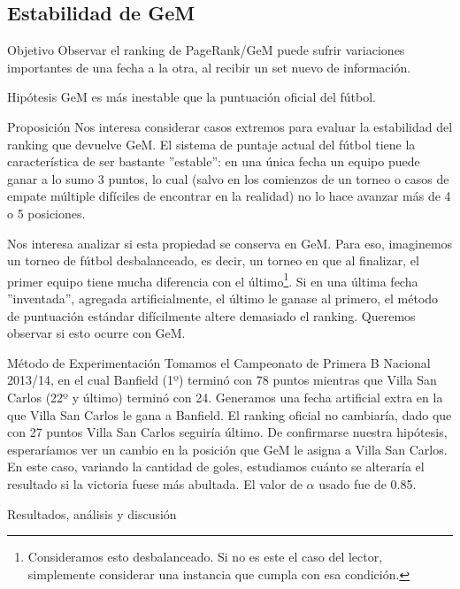 \subsection{Estabilidad de GeM}
\label{subsec:exp7}
\begin{LaTeXdescription}
    \item[Objetivo] Observar el ranking de PageRank/GeM puede sufrir variaciones
        importantes de una fecha a la otra, al recibir un set nuevo de
        informaci\'on.\\

    \item[Hip\'otesis] GeM es m\'as inestable que la puntuaci\'on oficial del
        f\'utbol.\\

    \item[Proposici\'on] Nos interesa considerar casos extremos para evaluar la
        estabilidad del ranking que devuelve GeM. El sistema de puntaje actual
        del f\'utbol tiene la caracter\'istica de ser bastante ''estable'': en
        una \'unica fecha un equipo puede ganar a lo sumo 3 puntos, lo cual
        (salvo en los comienzos de un torneo o casos de empate m\'ultiple
        dif\'iciles de encontrar en la realidad) no lo hace avanzar m\'as de 4 o
        5 posiciones.

        \par Nos interesa analizar si esta propiedad se conserva en GeM. Para
        eso, imaginemos un torneo de f\'utbol desbalanceado, es decir, un torneo
        en que al finalizar, el primer equipo tiene mucha diferencia con el
        \'ultimo\footnote{Consideramos esto desbalanceado. Si no es este el
        caso del lector, simplemente considerar una instancia que cumpla con esa
        condici\'on.}. Si en una \'ultima fecha ''inventada'', agregada
        artificialmente, el \'ultimo le ganase al primero, el m\'etodo de
        puntuaci\'on est\'andar dif\'icilmente altere demasiado el ranking.
        Queremos observar si esto ocurre con GeM.\\

    \item[M\'etodo de Experimentaci\'on] Tomamos el Campeonato de Primera B
        Nacional 2013/14, en el cual Banfield (1º) termin\'o con 78 puntos
        mientras que Villa San Carlos (22º y \'ultimo) termin\'o con 24.
        Generamos una fecha artificial extra en la que Villa San Carlos le gana
        a Banfield. El ranking oficial no cambiar\'ia, dado que con 27
        puntos Villa San Carlos seguir\'ia \'ultimo. De confirmarse nuestra
        hip\'otesis, esperar\'iamos ver un cambio en la posición que GeM le
        asigna a Villa San Carlos. En este caso, variando la cantidad de goles,
        estudiamos cu\'anto se alterar\'ia el resultado si la victoria fuese
        m\'as abultada. El valor de $\alpha$ usado fue de 0.85.\\

    \item[Resultados, an\'alisis y discusi\'on]
\end{LaTeXdescription}

